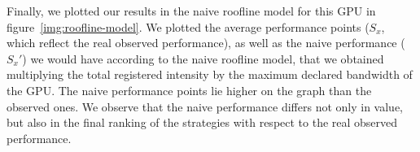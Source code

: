 \newpage
Finally,
we plotted our results in the naive roofline model for this GPU in figure~\ref{img:roofline-model}. We plotted the average performance points ($S_x$, which reflect the real observed performance), as well as the naive performance ($S_x'$) we would have according to the naive roofline model, that we obtained multiplying the total registered intensity by the maximum declared bandwidth of the GPU. The naive performance points lie higher on the graph than the observed ones. We observe that the naive performance differs not only in value, but also in the final ranking of the strategies with respect to the real observed performance.
